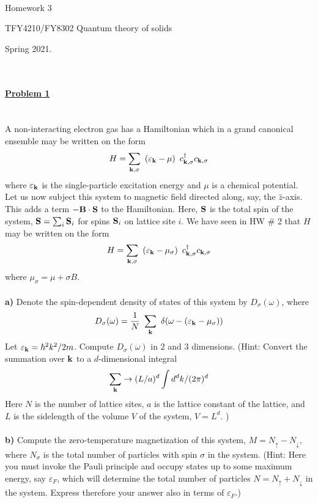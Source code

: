 \documentclass{article}
\begin{document}
\\

\centerline{\Large Homework 3}
\centerline{\Large  TFY4210/FY8302 Quantum  theory of solids}
\centerline{\Large Spring 2021.}
\normalsize
\ \\
\ \\
\underline{\large\bf Problem 1 }\\
\ \\
\ \\
A non-interacting electron gas has a Hamiltonian which in a grand canonical ensemble may be written on the form
\begin{eqnarray}
H = \sum_{{\bf k},\sigma} ~ \left( \varepsilon_{{\bf k}} - \mu \right) ~ c^{\dagger}_{{\bf k}, \sigma}    c_{{\bf k}, \sigma}   \nonumber
\end{eqnarray}
where $\varepsilon_{{\bf k}}$ is the single-particle excitation energy and $\mu$ is a chemical potential. Let us now subject this system to magnetic field directed along, say, the $\hat z$-axis. This adds a term $- {\bf B}\cdot {\bf S}$ to the Hamiltonian. Here, ${\bf S}$ is the total spin of the system, ${\bf S} = \sum_i {\bf S}_i$ for spins ${\bf S}_i$ on lattice site $i$. 
We have seen in HW $\#$ 2 that  $H$ may be written on the form
 \begin{eqnarray}
H = \sum_{{\bf k},\sigma} ~ \left( \varepsilon_{{\bf k}} - \mu_\sigma \right) ~ c^{\dagger}_{{\bf k}, \sigma}    c_{{\bf k}, \sigma}   \nonumber
\end{eqnarray}
where $\mu_\sigma = \mu + \sigma B$.
\ \\
\ \\
{\bf a)} Denote the spin-dependent density of states of this system by $D_\sigma(\omega)$, where
\begin{eqnarray}
D_\sigma(\omega) = \frac{1}{N} ~ \sum_{{\bf k}} ~\delta(\omega -( \varepsilon_{{\bf k}} - \mu_\sigma  )) \nonumber
\end{eqnarray} 
Let $\varepsilon_{{\bf k}} = \hbar^2 k^2/2m$. Compute $D_\sigma(\omega)$ in $2$ and $3$ dimensions. (Hint: Convert the summation over ${\bf k}$ to a $d$-dimensional integral 
$$ \sum_{{\bf k}} \to (L/a)^d \int d^d k/(2\pi)^d$$ 
Here $N$ is the number of lattice sites, $a$ is the lattice constant of the lattice, and $L$ is the sidelength of the volume $V$ of the system, $V=L^d$. )  
\ \\
\ \\
{\bf b)} Compute the zero-temperature magnetization of this system, $M = N_{\uparrow}- N_{\downarrow}$, where $N_\sigma$ is the total number of particles with spin $\sigma$ in the system. (Hint: Here you must invoke the Pauli principle and occupy states up to some maximum energy, say $\varepsilon_F$, which will determine the total number of particles $N=N_{\uparrow}+ N_{\downarrow}$ in the system. Express therefore your answer also in terms of $\varepsilon_F$.)
\end{document}
